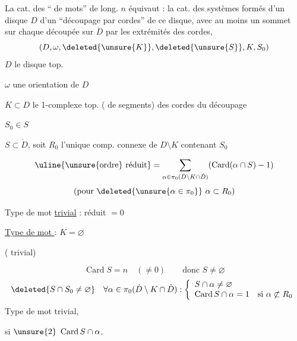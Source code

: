 La cat. des `` de mots'' de long. $n$ équivaut : la cat.  des systèmes formés d'un disque $D$  d'un ``découpage par cordes'' de ce disque, avec au moins un sommet sur chaque  découpée sur $\dot D$ par les extrémités des cordes,
\[
(D,\omega,\deleted{\unsure{K}},\deleted{\unsure{S}},K,S_0)
\]
$D$ le disque top.\par
$\omega$ une orientation de $D$\par
$K\subset D$ le 1-complexe top. (  de segments) des cordes du découpage\par
$S_0\in S$ \par
$S\subset\dot D$, soit $R_0$ l'unique comp. connexe de $D\setminus K$ contenant $S_0$

\[
\uline{\text{\unsure{ordre} réduit}}=\sum_{\alpha\in\pi_0(\dot D\setminus K\cap\dot D)}(\operatorname{Card}(\alpha\cap S)-1)
\]
\[
(\text{pour }\deleted{\unsure{\alpha\in\pi_0}}\ \alpha\subset R_0)
\]

Type de mot \uline{trivial} :  réduit $=0$\par
\uline{Type de mot } : $K=\varnothing$\par
( trivial)

\[
\operatorname{Card}S=n\quad(\ne0)\qquad\text{donc }S\ne\varnothing
\]
\[
\deleted{S\cap S_0\ne\varnothing}\quad
\forall\alpha\in\pi_0(\dot D\setminus K\cap\dot D):
\left\{\begin{array}{l}
S\cap\alpha\ne\varnothing\\
\operatorname{Card}S\cap\alpha=1\quad\text{si }\alpha\not\subset R_0
\end{array}\right.
\]
Type de mot trivial,\par
si $\unsure{2}\ \operatorname{Card}S\cap\alpha$.

